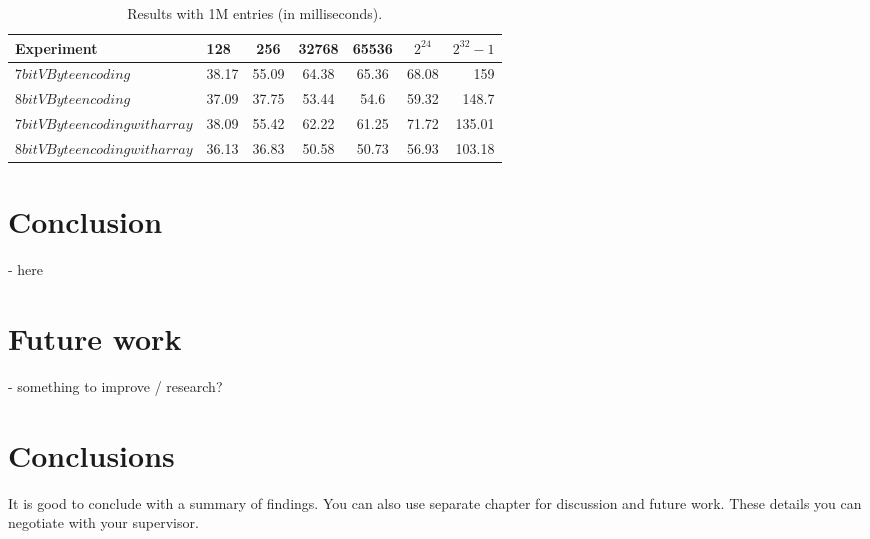 \begin{table}
\centering
\caption{Results with 1M entries (in milliseconds).\label{table:results2}}
\begin{tabular}{l||l c c c c r} 
Experiment & 128 & 256 & 32768 & 65536 & $2^{24}$ & $2^{32} -1$ \\ 
\hline \hline 
$7bit VByte encoding$ & 38.17 & 55.09 & 64.38 & 65.36 & 68.08 & 159 \\
$8bit VByte encoding$ & 37.09 & 37.75 & 53.44 & 54.6 & 59.32 & 148.7\\
$7bit VByte encoding with array$ & 38.09 & 55.42 & 62.22 & 61.25 & 71.72 & 135.01\\
$8bit VByte encoding with array$ & 36.13 & 36.83 & 50.58 & 50.73 & 56.93 & 103.18\\

\hline
%
\end{tabular}
\end{table}

\chapter{Conclusion}
 - here

\chapter{Future work}
 - something to improve / research?

\chapter{Conclusions\label{chapter:conclusions}}

It is good to conclude with a summary of findings. You can also use separate chapter for discussion and future work. These details you can negotiate with your supervisor.
